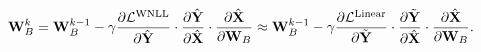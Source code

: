 \documentclass{article}
\begin{document}



\begin{equation}
\mathbf{W}_B^{k} =  \mathbf{W}_B^{k-1} - \gamma \frac{\partial \mathcal{L}^{\rm WNLL}}{\partial \hat{\mathbf{Y}}}\cdot \frac{\partial \hat{\mathbf{Y}}}{\partial \hat{\mathbf{X}}}\cdot \frac{\partial \hat{\mathbf{X}}}{\partial \mathbf{W}_B} \approx \mathbf{W}_B^{k-1} - \gamma \frac{\partial \mathcal{L}^{\rm Linear}}{\partial \tilde{\mathbf{Y}}}\cdot \frac{\partial \tilde{\mathbf{Y}}}{\partial \hat{\mathbf{X}}}\cdot \frac{\partial \hat{\mathbf{X}}}{\partial \mathbf{W}_B}.
\label{eq:bp-wnll}
\end{equation}
\end{document}
